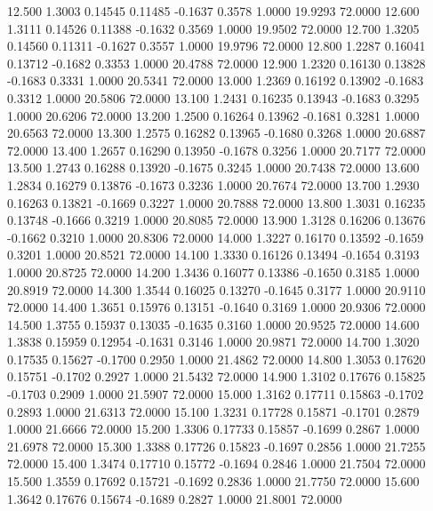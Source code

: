   12.500   1.3003   0.14545   0.11485  -0.1637   0.3578   1.0000  19.9293  72.0000
  12.600   1.3111   0.14526   0.11388  -0.1632   0.3569   1.0000  19.9502  72.0000
  12.700   1.3205   0.14560   0.11311  -0.1627   0.3557   1.0000  19.9796  72.0000
  12.800   1.2287   0.16041   0.13712  -0.1682   0.3353   1.0000  20.4788  72.0000
  12.900   1.2320   0.16130   0.13828  -0.1683   0.3331   1.0000  20.5341  72.0000
  13.000   1.2369   0.16192   0.13902  -0.1683   0.3312   1.0000  20.5806  72.0000
  13.100   1.2431   0.16235   0.13943  -0.1683   0.3295   1.0000  20.6206  72.0000
  13.200   1.2500   0.16264   0.13962  -0.1681   0.3281   1.0000  20.6563  72.0000
  13.300   1.2575   0.16282   0.13965  -0.1680   0.3268   1.0000  20.6887  72.0000
  13.400   1.2657   0.16290   0.13950  -0.1678   0.3256   1.0000  20.7177  72.0000
  13.500   1.2743   0.16288   0.13920  -0.1675   0.3245   1.0000  20.7438  72.0000
  13.600   1.2834   0.16279   0.13876  -0.1673   0.3236   1.0000  20.7674  72.0000
  13.700   1.2930   0.16263   0.13821  -0.1669   0.3227   1.0000  20.7888  72.0000
  13.800   1.3031   0.16235   0.13748  -0.1666   0.3219   1.0000  20.8085  72.0000
  13.900   1.3128   0.16206   0.13676  -0.1662   0.3210   1.0000  20.8306  72.0000
  14.000   1.3227   0.16170   0.13592  -0.1659   0.3201   1.0000  20.8521  72.0000
  14.100   1.3330   0.16126   0.13494  -0.1654   0.3193   1.0000  20.8725  72.0000
  14.200   1.3436   0.16077   0.13386  -0.1650   0.3185   1.0000  20.8919  72.0000
  14.300   1.3544   0.16025   0.13270  -0.1645   0.3177   1.0000  20.9110  72.0000
  14.400   1.3651   0.15976   0.13151  -0.1640   0.3169   1.0000  20.9306  72.0000
  14.500   1.3755   0.15937   0.13035  -0.1635   0.3160   1.0000  20.9525  72.0000
  14.600   1.3838   0.15959   0.12954  -0.1631   0.3146   1.0000  20.9871  72.0000
  14.700   1.3020   0.17535   0.15627  -0.1700   0.2950   1.0000  21.4862  72.0000
  14.800   1.3053   0.17620   0.15751  -0.1702   0.2927   1.0000  21.5432  72.0000
  14.900   1.3102   0.17676   0.15825  -0.1703   0.2909   1.0000  21.5907  72.0000
  15.000   1.3162   0.17711   0.15863  -0.1702   0.2893   1.0000  21.6313  72.0000
  15.100   1.3231   0.17728   0.15871  -0.1701   0.2879   1.0000  21.6666  72.0000
  15.200   1.3306   0.17733   0.15857  -0.1699   0.2867   1.0000  21.6978  72.0000
  15.300   1.3388   0.17726   0.15823  -0.1697   0.2856   1.0000  21.7255  72.0000
  15.400   1.3474   0.17710   0.15772  -0.1694   0.2846   1.0000  21.7504  72.0000
  15.500   1.3559   0.17692   0.15721  -0.1692   0.2836   1.0000  21.7750  72.0000
  15.600   1.3642   0.17676   0.15674  -0.1689   0.2827   1.0000  21.8001  72.0000
